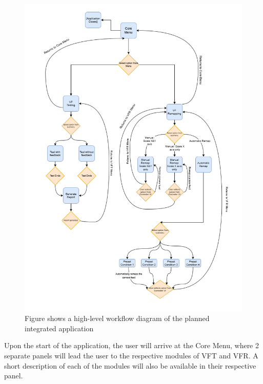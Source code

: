 \documentclass{l4proj}
\begin{document}
\begin{figure}[!h]
    \centering
    \includegraphics[width=1.0\linewidth]{images/designDiagramVert.png}
    \caption{Figure shows a high-level workflow diagram of the planned integrated application}
    \label{fig:designDiagram}
\end{figure}



Upon the start of the application, the user will arrive at the Core Menu, where 2 separate panels will lead the user to the respective modules of VFT and VFR. A short description of each of the modules will also be available in their respective panel. 
\end{document}

